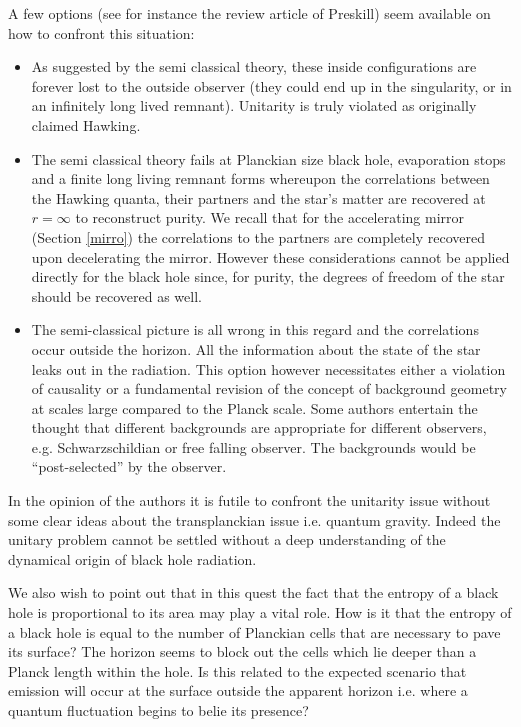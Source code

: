 \documentclass[12pt,oneside]{report}
\begin{document}
A few 
options (see for instance the
review article of Preskill\cite{Presk})
seem available on how to confront this situation: 
\begin{itemize} 
\item 
As suggested by the semi classical theory, these inside
configurations are forever lost to the outside observer
(they could end up in the singularity, or in an infinitely
long lived remnant). Unitarity 
is truly violated as originally claimed Hawking\cite{Hawk3}. 

\item The semi classical theory fails at Planckian size black hole, evaporation
stops and a finite long living 
remnant forms whereupon the correlations between the Hawking quanta,
their partners and 
the star's matter are recovered at $r=\infty$ to reconstruct purity.
We recall that for the accelerating mirror (Section \ref{mirro})
the correlations to the partners are completely recovered upon decelerating the mirror. However these considerations cannot be applied directly
for the black hole since, for purity, the degrees of freedom of the star should be recovered as well.

\item 
The semi-classical picture is all wrong in
this regard and the correlations occur 
outside the horizon. 
All the information about the state
of the star leaks out in the radiation\cite{THooft}\cite{THooft2}\cite{SVV}.
 This option however
necessitates either a violation of causality or a
fundamental revision of the concept of background geometry
at scales large compared to the Planck scale. Some authors entertain the
thought that different backgrounds are appropriate for different 
observers\cite{STUg},
e.g. Schwarzschildian or free falling observer. The backgrounds would be
``post-selected'' by the observer. \end{itemize}

In the opinion of the authors it is futile to confront
the unitarity issue without some clear ideas about the
transplanckian issue i.e. quantum gravity.
Indeed the unitary problem cannot be settled without a deep understanding of
the dynamical origin of black hole radiation.

We also wish to
point out that in this quest the fact that the entropy of
a black hole is proportional to its area may play a vital
role. How is it that the entropy of a black hole is equal
to the number of Planckian cells 
 that are necessary to
pave its surface? The horizon seems to block out the
cells which lie deeper than a Planck length within the
hole. Is this related to the expected scenario that
emission will occur at the surface outside the apparent 
horizon i.e. where a quantum
fluctuation begins to belie its presence?
\end{document}
